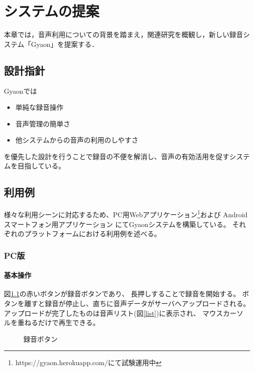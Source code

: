 \chapter{システムの提案}
\label{chap:proposal}

本章では，音声利用についての背景を踏まえ，関連研究を概観し，新しい録音システム「Gyaon」を提案する．

\newpage

\section{設計指針}

Gyaonでは
\begin{itemize}
\item 単純な録音操作
\item 音声管理の簡単さ
\item 他システムからの音声の利用のしやすさ
\end{itemize}
を優先した設計を行うことで録音の不便を解消し、音声の有効活用を促すシステムを目指している。

\section{利用例}
様々な利用シーンに対応するため、PC用Webアプリケーション\footnote{\textsf{https://gyaon.herokuapp.com/にて試験運用中}}および
Androidスマートフォン用アプリケーション
にてGyaonシステムを構築している。
それぞれのプラットフォームにおける利用例を述べる。

\subsection{PC版}

\subsubsection{基本操作}
図\ref{button}の赤いボタンが録音ボタンであり、
長押しすることで録音を開始する。
ボタンを離すと録音が停止し、直ちに音声データがサーバへアップロードされる。
アップロードが完了したものは音声リスト(図\ref{list})に表示され、
マウスカーソルを重ねるだけで再生できる。

\begin{figure}[H]
\centering
{}
\caption{録音ボタン}
\label{button}
\end{figure}

